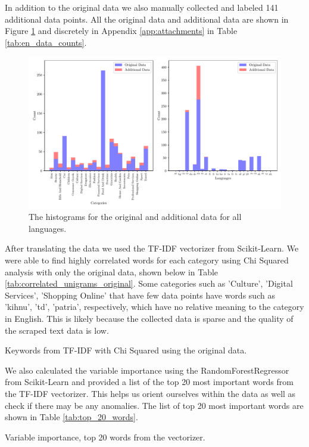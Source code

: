 In addition to the original data we also manually collected and labeled 141 additional data points. All the original data and additional data are shown in Figure \ref{fig:all_hist} and discretely in Appendix \ref{app:attachments} in Table \ref{tab:en_data_counts}.


\begin{figure}[!ht]
  \centering
  \includegraphics[width=\textwidth]{../img/plot_all_hist.pdf}
  \caption{The histograms for the original and additional data for all languages.}
  \label{fig:all_hist}
\end{figure}


After translating the data we used the TF-IDF vectorizer from Scikit-Learn. We were able to find highly correlated words for each category using Chi Squared analysis with only the original data, shown below in Table \ref{tab:correlated_unigrams_original}. Some categories such as 'Culture', 'Digital Services', 'Shopping Online' that have few data points have words such as 'kihnu', 'td', 'patria', respectively, which have no relative meaning to the category in English. This is likely because the collected data is sparse and the quality of the scraped text data is low.


\begin{table}[!ht]
\centering
\caption{Keywords from TF-IDF with Chi Squared using the original data.}

\label{tab:correlated_unigrams_original}
\end{table}


We also calculated the variable importance using the RandomForestRegressor from Scikit-Learn and provided a list of the top 20 most important words from the TF-IDF vectorizer. This helps us orient ourselves within the data as well as check if there may be any anomalies. The list of top 20 most important words are shown in Table \ref{tab:top_20_words}.


\begin{table}[!ht]
\centering
\caption{Variable importance, top 20 words from the vectorizer.}

\label{tab:top_20_words}
\end{table}



